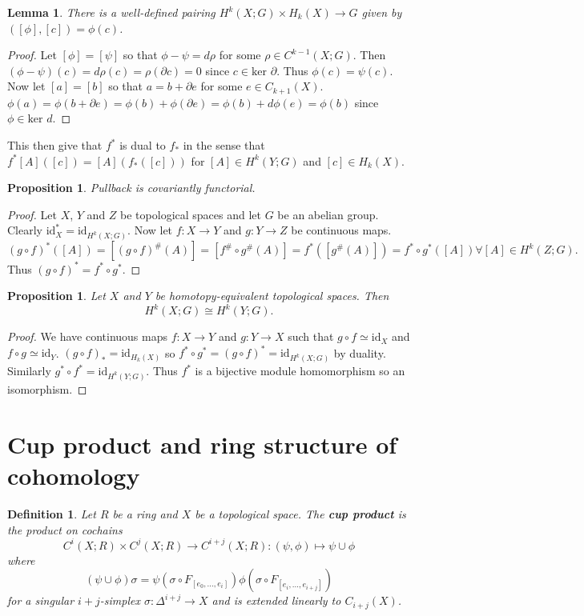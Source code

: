 \documentclass{article}
\newtheorem{definition}[theorem]{Definition}
\newtheorem{lemma}[theorem]{Lemma}
\newtheorem{proposition}[theorem]{Proposition}
\begin{document}
\begin{lemma}
There is a well-defined pairing $H^k(X;G)\times H_k(X)\to G$ given by $([\phi],[c])=\phi(c)$.
\end{lemma}
\begin{proof}
Let $[\phi]=[\psi]$ so that $\phi-\psi=d\rho$ for some $\rho\in C^{k-1}(X;G)$. Then $(\phi-\psi)(c)=d\rho(c)=\rho(\partial c)=0$ since $c\in\text{ker }\partial$. Thus $\phi(c)=\psi(c)$.
Now let $[a]=[b]$ so that $a=b+\partial e$ for some $e\in C_{k+1}(X)$. $\phi(a)=\phi(b+\partial e)=\phi(b)+\phi(\partial e)=\phi(b)+d\phi(e)=\phi(b)$ since $\phi\in\text{ker }d$.
\end{proof}

\noindent This then give that $f^*$ is dual to $f_*$ in the sense that $f^*[A]([c])=[A](f_*([c]))$ for $[A]\in H^k(Y;G)$ and $[c]\in H_k(X)$.

\begin{proposition}
Pullback is covariantly functorial.
\end{proposition}
\begin{proof}
Let $X$, $Y$ and $Z$ be topological spaces and let $G$ be an abelian group. 
Clearly $\text{id}_X^*=\text{id}_{H^k(X;G)}$.
Now let $f\colon X\to Y$ and $g\colon Y\to Z$ be continuous maps. \[(g\circ f)^*([A])=[(g\circ f)^\#(A)]=[f^\#\circ g^\#(A)]=f^*([g^\#(A)])=f^*\circ g^*([A])\forall [A]\in H^k(Z;G).\] Thus $(g\circ f)^*=f^*\circ g^*$.
\end{proof}

\begin{proposition}
Let $X$ and $Y$ be homotopy-equivalent topological spaces. Then \[H^k(X;G)\cong H^k(Y;G).\]
\end{proposition}
\begin{proof}
We have continuous maps $f\colon X\to Y$ and $g\colon Y\to X$ such that $g\circ f\simeq\text{id}_X$ and $f\circ g\simeq\text{id}_Y$. $(g\circ f)_*=\text{id}_{H_k(X)}$ so $f^*\circ g^*=(g\circ f)^*=\text{id}_{H^k(X;G)}$ by duality. Similarly $g^*\circ f^*=\text{id}_{H^k(Y;G)}$. Thus $f^*$ is a bijective module homomorphism so an isomorphism.
\end{proof}


\section{Cup product and ring structure of cohomology}
\begin{definition}
Let $R$ be a ring and $X$ be a topological space. The \textbf{cup product} is the product on cochains\[C^i(X;R)\times C^j(X;R)\to C^{i+j}(X;R):(\psi,\phi)\mapsto\psi\cup\phi\] where \[(\psi\cup\phi)\sigma=\psi(\sigma\circ F_{[e_0,...,e_i]})\phi(\sigma\circ F_{[e_i,...,e_{i+j}]})\] for a singular $i+j$-simplex $\sigma\colon\Delta^{i+j}\to X$ and is extended linearly to $C_{i+j}(X)$.
\end{definition}
\end{document}
